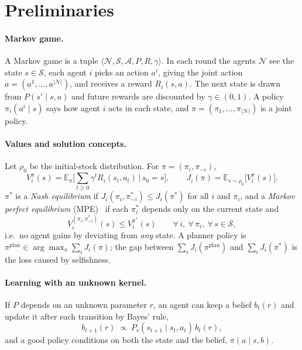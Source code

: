 \documentclass{article}
\begin{document}
\section{Preliminaries}
\label{sec:prelim}
\paragraph{Markov game.} A Markov game is a tuple $\langle \mathcal N, \mathcal S, \mathcal A, P, R, \gamma\rangle$. In each round the agents $\mathcal N$ see the state $s\in\mathcal S$, each agent $i$ picks an action $a^i$, giving the joint action $a=(a^1,\dots,a^{|\mathcal N|})$, and receives a reward $R_i(s,a)$. The next state is drawn from $P(s'\mid s,a)$ and future rewards are discounted by $\gamma\in(0,1)$. A policy $\pi_i(a^i\mid s)$ says how agent $i$ acts in each state, and $\pi=(\pi_1,\dots,\pi_{|\mathcal N|})$ is a joint policy.

\paragraph{Values and solution concepts.} Let $\rho_0$ be the initial-stock distribution. For $\pi=(\pi_i,\pi_{-i})$,
\begin{equation}
V_i^{\pi}(s)=\mathbb{E}_{\pi}\Big[\sum_{t\ge0}\gamma^{t}R_i(s_t,a_t)\,\Big|\,s_0=s\Big],\qquad
J_i(\pi)=\mathbb{E}_{s\sim\rho_0}\big[V_i^{\pi}(s)\big].
\end{equation}
$\pi^{*}$ is a \emph{Nash equilibrium} if $J_i(\pi_i,\pi^{*}_{-i})\le J_i(\pi^{*})$ for all $i$ and $\pi_i$, and a \emph{Markov perfect equilibrium} (MPE)~\cite{maskin2001} if each $\pi^{*}_i$ depends only on the current state and
\begin{equation}
V_i^{(\pi_i,\pi^{*}_{-i})}(s)\le V_i^{\pi^{*}}(s)\qquad\forall\, i,\ \forall\,\pi_i,\ \forall\, s\in\mathcal S,
\end{equation}
i.e.\ no agent gains by deviating from \emph{any} state. A planner policy is $\pi^{\mathrm{plan}}\in\arg\max_{\pi}\sum_{i}J_i(\pi)$; the gap between $\sum_i J_i(\pi^{\mathrm{plan}})$ and $\sum_i J_i(\pi^{*})$ is the loss caused by selfishness.

\paragraph{Learning with an unknown kernel.} If $P$ depends on an unknown parameter $r$, an agent can keep a belief $b_t(r)$ and update it after each transition by Bayes' rule,
\begin{equation}
b_{t+1}(r)\;\propto\;P_r(s_{t+1}\mid s_t,a_t)\,b_t(r),
\end{equation}
and a good policy conditions on both the state and the belief, $\pi(a\mid s,b)$.
\end{document}
